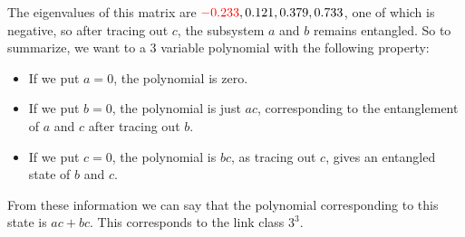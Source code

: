 \documentclass{scrartcl}
\begin{document}
	The eigenvalues of this matrix are $\textcolor{red}{-0.233}, 0.121, 0.379, 0.733$, one of which is negative, so after tracing out $c$, the subsystem $a$ and $b$ remains entangled.
 So to summarize, we want to a 3 variable polynomial with the following property:
	\begin{itemize}
		\item If we put $a = 0$, the polynomial is zero.
		\item If we put $b = 0$, the polynomial is just $ac$, corresponding to the entanglement of $a$ and $c$ after tracing out $b$.
		\item If we put $c = 0$, the polynomial is $bc$, as tracing out $c$, gives an entangled state of $b$ and $c$.
	\end{itemize}
	From these information we can say that the polynomial corresponding to this state is $ac + bc$. This corresponds to the link class $3^3$.
    
	 
\end{document}
